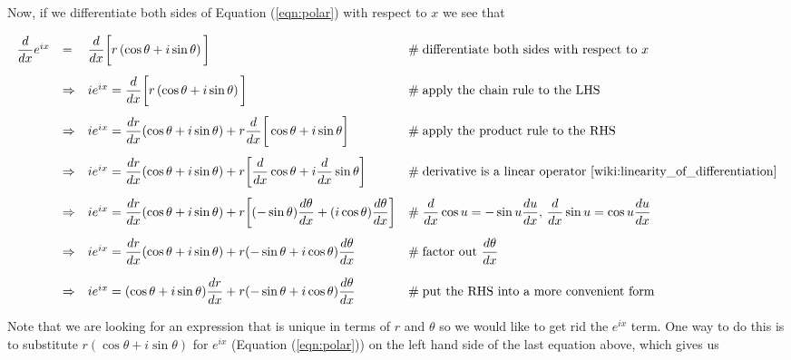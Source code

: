 \documentclass{article}
\theoremstyle{definition}
\begin{document}
\bigskip
\noindent
Now, if we differentiate both sides of Equation (\ref{eqn:polar})
with respect to $x$ we see that 


\begin{equation*}
\begin{array}{lllll}
\dfrac{d}{dx} e^{ix} 
&=& \dfrac{d}{dx} \bigg [  r \left ( \cos \theta + i \sin \theta \right ) \bigg ]
                &\mathrel{\#} \text{differentiate both sides with
                respect to $x$}  \\ 
[14pt]
&\Rightarrow& i  e^{ix}  = \dfrac{d}{dx} \bigg [  r \left ( \cos
                \theta + i \sin \theta \right ) \bigg ]
                &\mathrel{\#} \text{apply the chain rule to the LHS}  \\
[14pt]
&\Rightarrow& i  e^{ix}  = \dfrac{dr}{dx}  ( \cos \theta + i
                \sin \theta ) + r \dfrac{d}{dx} \bigg [ \cos
                \theta + i \sin \theta \bigg ] 
                &\mathrel{\#} \text{apply the product rule to the RHS}  \\
[14pt]
&\Rightarrow& i  e^{ix}  = \dfrac{dr}{dx}  ( \cos \theta + i
                \sin \theta ) + r \bigg [\dfrac{d}{dx} \cos \theta +i
                \dfrac{d}{dx} \sin \theta \bigg ]
                &\mathrel{\#} \text{derivative is a linear
                operator \cite{wiki:linearity_of_differentiation}} \\ 
[14pt]
&\Rightarrow& i  e^{ix}  = \dfrac{dr}{dx}  ( \cos \theta + i
                \sin \theta ) + r \bigg [(- \sin \theta) \dfrac{d
                \theta}{dx} + (i \cos \theta) \dfrac{d \theta}{dx} \bigg ]   
                &\mathrel{\#} \dfrac{d}{dx} \cos u = - \sin u
                        \dfrac{du}{dx}, \,  \dfrac{d}{dx} \sin u
                        = \cos u \dfrac{du}{dx}\\  
[14pt]
&\Rightarrow& i  e^{ix}  = \dfrac{dr}{dx}  ( \cos \theta + i
                \sin \theta ) + r (- \sin \theta + i \cos \theta)
                \dfrac{d\theta}{dx} 
                &\mathrel{\#} \text{factor out $\dfrac{d\theta}{dx}$}  \\ 
[14pt]
&\Rightarrow& i  e^{ix}  = ( \cos \theta + i \sin \theta )
                \dfrac{dr}{dx} + r (- \sin \theta + i \cos \theta )
                \dfrac{d\theta}{dx}
                &\mathrel{\#} \text{put the RHS into a more convenient form}
\end{array}
\end{equation*}

\bigskip
\noindent
Note that we are looking for an expression that is unique in
terms of $r$ and $\theta$ so we would like to get rid the
$e^{ix}$ term. One way to do this is to substitute $r (\cos
\theta + i \sin \theta)$ for $e^{ix}$ (Equation (\ref{eqn:polar}))
on the left hand side of the last equation above, which gives us
\end{document}
